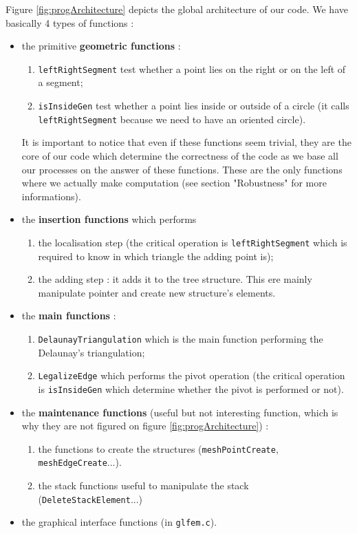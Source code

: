Figure \ref{fig:progArchitecture} depicts the global architecture of our code. We have basically 4 types of functions : 
\begin{itemize}
\item the primitive \textbf{geometric functions} : 
\begin{enumerate}
\item \texttt{leftRightSegment} test whether a point lies on the right or on the left of a segment;
\item \texttt{isInsideGen} test whether a point lies inside or outside of a circle (it calls \texttt{leftRightSegment} because we need to have an oriented circle).
\end{enumerate}
It is important to notice that even if these functions seem trivial, they are the core of our code which determine the correctness of the code as we base all our processes on the answer of these functions. These are the only functions where we actually make computation (see section "Robustness" for more informations).
\item the \textbf{insertion functions} which performs 
\begin{enumerate}
\item the localisation step (the critical operation is \texttt{leftRightSegment} which is required to know in which triangle the adding point is);
\item the adding step : it adds it to the tree structure. This ere mainly manipulate pointer and create new structure's elements.
\end{enumerate}
\item the \textbf{main functions} : 
\begin{enumerate}
\item \texttt{DelaunayTriangulation} which is the main function performing the Delaunay's triangulation;
\item \texttt{LegalizeEdge} which performs the pivot operation (the critical operation is \texttt{isInsideGen} which determine whether the pivot is performed or not).
\end{enumerate} 
\item the \textbf{maintenance functions} (useful but not interesting function, which is why they are not figured on figure \ref{fig:progArchitecture}) : 
\begin{enumerate}
\item the functions to create the structures (\texttt{meshPointCreate}, \texttt{meshEdgeCreate}...).
\item the stack functions useful to manipulate the stack (\texttt{DeleteStackElement}...)
\end{enumerate}
\item the graphical interface functions (in \texttt{glfem.c}).
\end{itemize}